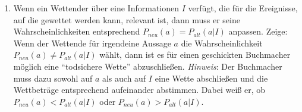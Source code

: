 \begin{enumerate}
  \item Wenn ein Wettender über eine Informationen $I$ verfügt, die für die
  Ereignisse, auf die gewettet werden kann, relevant ist, dann muss er seine
  Wahrscheinlichkeiten entsprechend $P_{neu}(a) = P_{alt}(a|I)$ anpassen.
  Zeige: Wenn der Wettende für irgendeine Aussage $a$ die Wahrscheinlichkeit 
  $P_{neu}(a) \neq P_{alt}(a|I)$ wählt, dann ist es für einen geschickten
  Buchmacher möglich eine "`todsichere Wette"' abzuschließen.
  {\em Hinweis}: Der Buchmacher muss dazu sowohl auf $a$ als auch auf $I$ eine
  Wette abschließen und die Wettbeträge entsprechend aufeinander abstimmen.
  Dabei weiß er, ob $P_{neu}(a) < P_{alt}(a|I)$ oder $P_{neu}(a) >
  P_{alt}(a|I)$. 
\end{enumerate}
